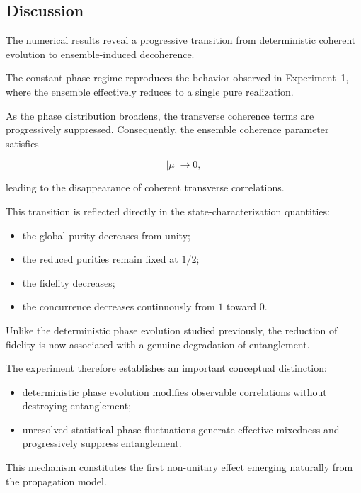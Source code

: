 
\subsection{Discussion}

The numerical results reveal a progressive transition from deterministic coherent evolution to ensemble-induced decoherence.

The constant-phase regime reproduces the behavior observed in Experiment~1, where the ensemble effectively reduces to a single pure realization.

As the phase distribution broadens, the transverse coherence terms are progressively suppressed. Consequently, the ensemble coherence parameter satisfies

\[
|\mu|
\rightarrow
0,
\]

leading to the disappearance of coherent transverse correlations.

This transition is reflected directly in the state-characterization quantities:

\begin{itemize}
    \item the global purity decreases from unity;
    \item the reduced purities remain fixed at \(1/2\);
    \item the fidelity decreases;
    \item the concurrence decreases continuously from \(1\) toward \(0\).
\end{itemize}

Unlike the deterministic phase evolution studied previously, the reduction of fidelity is now associated with a genuine degradation of entanglement.

The experiment therefore establishes an important conceptual distinction:

\begin{itemize}
    \item deterministic phase evolution modifies observable correlations without destroying entanglement;
    \item unresolved statistical phase fluctuations generate effective mixedness and progressively suppress entanglement.
\end{itemize}

This mechanism constitutes the first non-unitary effect emerging naturally from the propagation model.

